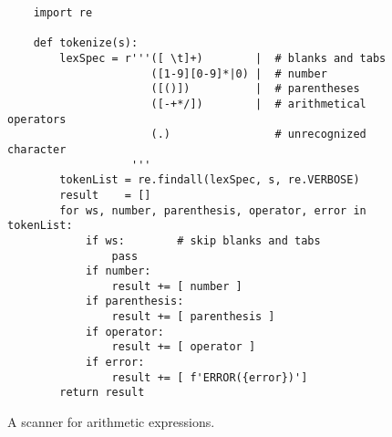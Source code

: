 \begin{figure}[!ht]
\centering
\begin{verbatim}
    import re
    
    def tokenize(s):
        lexSpec = r'''([ \t]+)        |  # blanks and tabs
                      ([1-9][0-9]*|0) |  # number
                      ([()])          |  # parentheses 
                      ([-+*/])        |  # arithmetical operators
                      (.)                # unrecognized character
                   '''
        tokenList = re.findall(lexSpec, s, re.VERBOSE)
        result    = []
        for ws, number, parenthesis, operator, error in tokenList:
            if ws:        # skip blanks and tabs
                pass
            if number:
                result += [ number ]
            if parenthesis:
                result += [ parenthesis ]
            if operator:
                result += [ operator ]
            if error:
                result += [ f'ERROR({error})']
        return result
\end{verbatim}
\vspace*{-0.3cm}
\caption{A scanner for arithmetic expressions.}
\label{fig:Top-Down-Parser:scanner.ipynb}
\end{figure}


